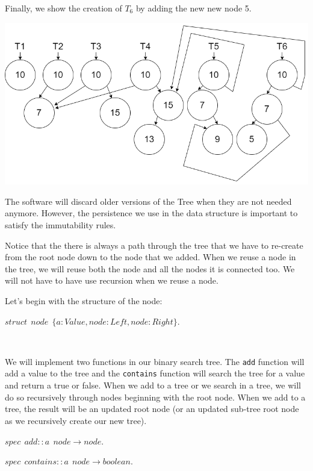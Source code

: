 \documentclass[
]{book}
\begin{document}
Finally, we show the creation of \(T_6\) by adding the new new node 5.

\includegraphics{images/bst_6.drawio.png}

The software will discard older versions of the Tree when they are not needed anymore. However, the persistence we use in the data structure is important to satisfy the immutability rules.

Notice that the there is always a path through the tree that we have to re-create from the root node down to the node that we added. When we reuse a node in the tree, we will reuse both the node and all the nodes it is connected too. We will not have to have use recursion when we reuse a node.

Let's begin with the structure of the node:

\begin{formulabox}
\(struct ~ ~ node ~ ~ \lbrace a:Value, node:\mathit{Left}, node:Right \rbrace.\)

\end{formulabox}

\(\nonumber\)

We will implement two functions in our binary search tree. The \texttt{add} function will add a value to the tree and the \texttt{contains} function will search the tree for a value and return a true or false. When we add to a tree or we search in a tree, we will do so recursively through nodes beginning with the root node. When we add to a tree, the result will be an updated root node (or an updated sub-tree root node as we recursively create our new tree).

\begin{formulabox}
\(spec ~ ~ add :: a ~ ~ node \rightarrow node.\)

\(spec ~ ~ contains :: a ~ ~ node \rightarrow boolean.\)

\end{formulabox}
\end{document}
